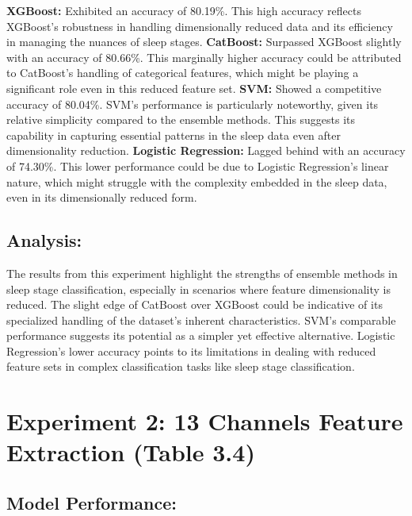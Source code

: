 \documentclass[12pt, a4paper,oneside]{book}
\numberwithin{equation}{section}
\begin{document}
\textbf{XGBoost:} Exhibited an accuracy of 80.19\%. This high accuracy reflects XGBoost's robustness in handling dimensionally reduced data and its efficiency in managing the nuances of sleep stages.\newline
\textbf{CatBoost:} Surpassed XGBoost slightly with an accuracy of 80.66\%. This marginally higher accuracy could be attributed to CatBoost’s handling of categorical features, which might be playing a significant role even in this reduced feature set.\newline
\textbf{SVM:} Showed a competitive accuracy of 80.04\%. SVM's performance is particularly noteworthy, given its relative simplicity compared to the ensemble methods. This suggests its capability in capturing essential patterns in the sleep data even after dimensionality reduction.\newline
\textbf{Logistic Regression:} Lagged behind with an accuracy of 74.30\%. This lower performance could be due to Logistic Regression’s linear nature, which might struggle with the complexity embedded in the sleep data, even in its dimensionally reduced form.

\subsection{Analysis:}

The results from this experiment highlight the strengths of ensemble methods in sleep stage classification, especially in scenarios where feature dimensionality is reduced. The slight edge of CatBoost over XGBoost could be indicative of its specialized handling of the dataset's inherent characteristics. SVM's comparable performance suggests its potential as a simpler yet effective alternative. Logistic Regression’s lower accuracy points to its limitations in dealing with reduced feature sets in complex classification tasks like sleep stage classification.

\section{Experiment 2: 13 Channels Feature Extraction (Table 3.4)}
\subsection{Model Performance:} 
\end{document}

